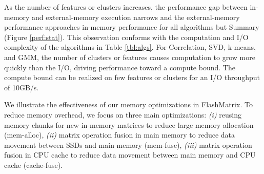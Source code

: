 As the number of features or clusters increases,
the performance gap between in-memory and external-memory execution
narrows and the external-memory performance approaches 
in-memory performance for all algorithms but Summary (Figure \ref{perf:stat}).
This observation conforms with the computation and I/O complexity of
the algorithms in Table \ref{tbl:algs}.
For Correlation, SVD, k-means, and GMM, the number of clusters or features causes computation
to grow more quickly than the I/O, driving performance toward a compute bound.
The compute bound can be realized on few features or clusters for an I/O throughput of 10GB/s.


We illustrate the effectiveness of our memory
optimizations in FlashMatrix. To reduce memory overhead, we focus on three
main optimizations: \textit{(i)} reusing memory chunks for new in-memory
matrices to reduce large memory allocation (mem-alloc),
\textit{(ii)} matrix operation fusion in main memory to reduce data movement
between SSDs and main memory (mem-fuse), \textit{(iii)} matrix operation
fusion in CPU cache to reduce data movement between main memory and CPU cache
(cache-fuse).

